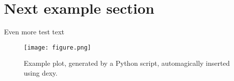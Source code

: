 \section{Next example section}

Even more test text

\begin{figure}[ht]
  \begin{center}
    \texttt{[image: figure.png]}
  \end{center}
  \caption{Example plot, generated by a Python script, automagically inserted
           using dexy.}
  \label{fig:trc}
\end{figure}

